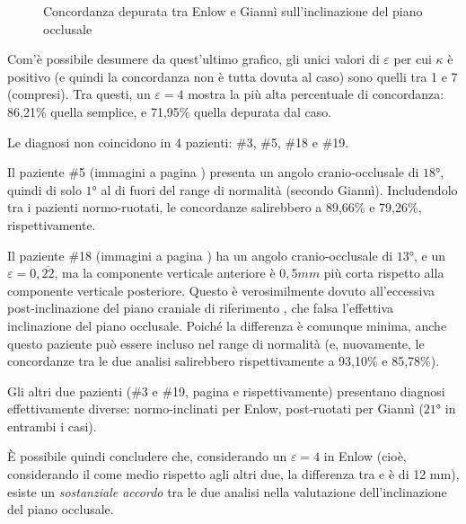 \begin{figure}[ht!]
\centering

\caption{Concordanza depurata tra Enlow e Giannì sull'inclinazione del piano occlusale}
\label{graph:inclinazione_pof_kappa}
\end{figure}

Com'è possibile desumere da quest'ultimo grafico, gli unici valori di $\varepsilon$ per cui $\kappa$ è positivo (e quindi la concordanza non è tutta dovuta al caso) sono quelli tra 1 e 7 (compresi). Tra questi, un $\varepsilon = 4$ mostra la più alta percentuale di concordanza: 86,21\% quella semplice, e 71,95\% quella depurata dal caso.

Le diagnosi non coincidono in $4$ pazienti: \#3, \#5, \#18 e \#19.

Il paziente \#5 (immagini a pagina \pageref{paz:EMALO2001}) presenta un angolo cranio-occlusale di $18°$, quindi di solo $1°$ al di fuori del range di normalità (secondo Giannì). Includendolo tra i pazienti normo-ruotati, le concordanze salirebbero a 89,66\% e 79,26\%, rispettivamente.

Il paziente \#18 (immagini a pagina \pageref{paz:TILO1999}) ha un angolo cranio-occlusale di $13°$, e un $\varepsilon = 0,\overline{22}$, ma la componente verticale anteriore è $0,5 mm$ più corta rispetto alla componente verticale posteriore. Questo è verosimilmente dovuto all'eccessiva post-inclinazione del piano craniale di riferimento , che falsa l'effettiva inclinazione del piano occlusale. Poiché la differenza è comunque minima, anche questo paziente può essere incluso nel range di normalità (e, nuovamente, le concordanze tra le due analisi salirebbero rispettivamente a 93,10\% e 85,78\%).

Gli altri due pazienti (\#3 e \#19, pagina \pageref{paz:MASCHI2000} e \pageref{paz:ELITRI1998} rispettivamente) presentano diagnosi effettivamente diverse: normo-inclinati per Enlow, post-ruotati per Giannì ($21°$ in entrambi i casi).

È possibile quindi concludere che, considerando un $\varepsilon = 4$ in Enlow (cioè, considerando il  come medio rispetto agli altri due, la differenza tra  e  è di 12 mm), esiste un \emph{sostanziale accordo} tra le due analisi nella valutazione dell'inclinazione del piano occlusale.